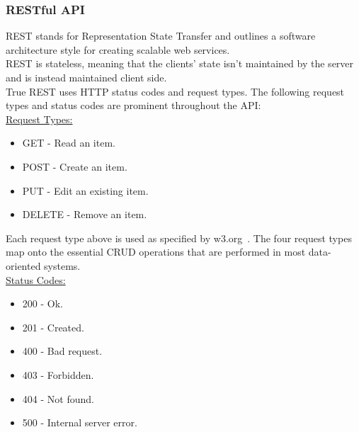 \documentclass[draft,preprint,12pt,3p]{elsarticle}
\begin{document}
\subsubsection{RESTful API}

REST stands for Representation State Transfer and outlines a software architecture style for creating scalable web services.\\
REST is stateless, meaning that the clients' state isn't maintained by the server and is instead maintained client side.\\
True REST uses HTTP status codes and request types. The following request types and status codes are prominent throughout the API:\\

\underline{Request Types:}
\begin{itemize}
\item GET - Read an item.
\item POST - Create an item.
\item PUT - Edit an existing item.
\item DELETE - Remove an item.
\end{itemize}

Each request type above is used as specified by w3.org~\cite{w3}. The four request types map onto the essential CRUD operations that are performed in most data-oriented systems.\\

\underline{Status Codes:}
\begin{itemize}
\item 200 - Ok.
\item 201 - Created.
\item 400 - Bad request.
\item 403 - Forbidden.
\item 404 - Not found.
\item 500 - Internal server error.
\end{itemize}
\end{document}
